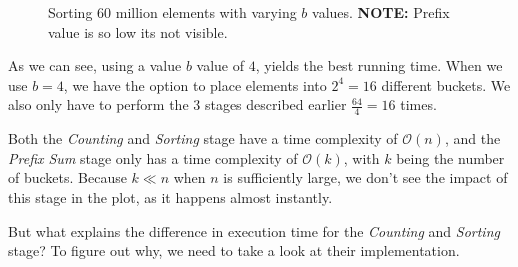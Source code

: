 \documentclass{article}
\begin{document}
\begin{figure}[H]
    \begin{center}
    \end{center}
    \caption{Sorting 60 million elements with varying \( b \) values. \textbf{NOTE:} Prefix value is so low its not visible.}
\end{figure}
\medskip

As we can see, using a value \( b \) value of \( 4 \), yields the best running time. When we use \( b = 4 \), we have the option to place elements into \( 2^{4} = 16  \) different buckets. We also only have to perform the 3 stages described earlier \( \frac{64}{4} = 16 \) times.
\medskip


Both the \textit{Counting} and \textit{Sorting} stage have a time complexity of \( \mathcal{O}\left(n\right) \), and the \textit{Prefix Sum} stage only has a time complexity of \( \mathcal{O}\left(k\right) \), with \( k \) being the number of buckets. Because \( k \ll n \) when \( n \) is sufficiently large, we don't see the impact of this stage in the plot, as it happens almost instantly.
\medskip

But what explains the difference in execution time for the \textit{Counting} and \textit{Sorting} stage? To figure out why, we need to take a look at their implementation.
\end{document}
